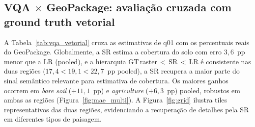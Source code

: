 \documentclass[12pt]{article}
\begin{document}
\subsection{VQA $\times$ GeoPackage: avaliação cruzada com ground truth vetorial}
\label{sec:vqa_vetorial}

A Tabela~\ref{tab:vqa_vetorial} cruza as estimativas de q01 com os
percentuais reais do GeoPackage. Globalmente, a SR estima a cobertura do
solo com erro $3{,}6$~pp menor que a LR (pooled), e a hierarquia
GT\,raster\,$<$\,SR\,$<$\,LR é consistente nas duas regiões
($17{,}4 < 19{,}1 < 22{,}7$~pp pooled), a SR recupera a maior parte do
sinal semântico relevante para estimativa de cobertura. Os maiores ganhos
ocorrem em \textit{bare soil} ($+11{,}1$~pp) e \textit{agriculture}
($+6{,}3$~pp) pooled, robustos em ambas as regiões
(Figura~\ref{fig:mae_multi}). A Figura~\ref{fig:grid} ilustra tiles
representativos das duas regiões, evidenciando a recuperação de detalhes
pela SR em diferentes tipos de paisagem.

\begin{table}[ht]
\centering
\caption{MAE (pp) de estimativa de cobertura vs.\ GeoPackage por classe,
  região e combinado. $\Delta=$LR$-$SR (positivo = SR melhor). Menor MAE
  é melhor. O MAE global usa os tiles cuja resposta de q01 tem formato
  parseável.}
\label{tab:vqa_vetorial}
\small
{}
\end{table}
\end{document}
